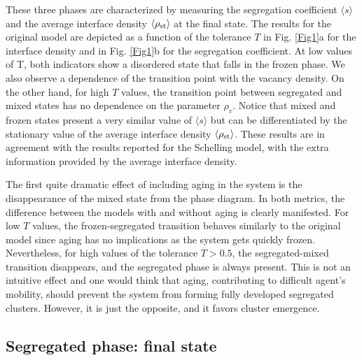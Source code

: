 These three phases are characterized by measuring the segregation coefficient $\langle s \rangle$ and the average interface density $\langle\rho_{\rm{st}} \rangle$ at the final state. The results for the original model are depicted as a function of the tolerance $T$ in Fig. \ref{Fig1}a for the interface density and in Fig. \ref{Fig1}b for the segregation coefficient. At low values of T, both indicators show a disordered state that falls in the frozen phase.  We also observe a dependence of the transition point with the vacancy density. On the other hand, for high $T$ values, the transition point between segregated and mixed states has no dependence on the parameter $\rho_v$. Notice that mixed and frozen states present a very similar value of $\langle s \rangle$ but can be differentiated by the stationary value of the average interface density $\langle\rho_{\rm{st}} \rangle$. These results are in agreement with the results reported for the Schelling model\cite{Gauvin_2009}, with the extra information provided by the average interface density.

The first quite dramatic effect of including aging in the system is the disappearance of the mixed state from the phase diagram. In both metrics, the difference between the models with and without aging is clearly manifested. For low $T$ values, the frozen-segregated transition behaves similarly to the original model since aging has no implications as the system gets quickly frozen. Nevertheless, for high values of the tolerance $T> 0.5$, the segregated-mixed transition disappears, and the segregated phase is always present. This is not an intuitive effect and one would think that aging, contributing to difficult agent's mobility, should prevent the system from forming fully developed segregated clusters. However, it is just the opposite, and it favors cluster emergence. 

\subsection{Segregated phase: final state}

